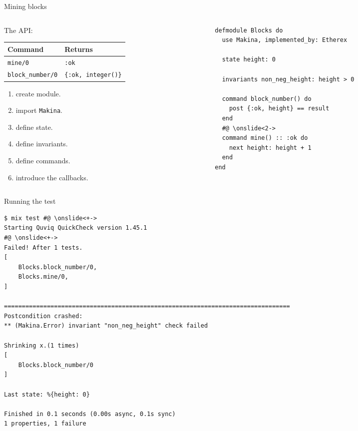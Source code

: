 \documentclass[aspectratio=169, 10pt]{beamer}
\begin{document}
\begin{frame}[label={sec:org8c4234a},fragile]{Mining blocks}
 \begin{columns}
\begin{column}{0.48\columnwidth}
The API:

\begin{center}
\begin{tabular}{ll}
Command & Returns\\
\hline
\texttt{mine/0} & \texttt{:ok}\\
\texttt{block\_number/0} & \texttt{\{:ok, integer()\}}\\
\end{tabular}
\end{center}

\vspace{10pt}
\begin{enumerate}
\item create module.
\item import \texttt{Makina}.
\item define state.
\item define invariants.
\item define commands.
\item introduce the callbacks.
\end{enumerate}
\end{column}

\begin{column}{0.48\columnwidth}
\lstset{language=elixir,label= ,caption= ,captionpos=b,numbers=none,style=display}
\begin{lstlisting}
defmodule Blocks do
  use Makina, implemented_by: Etherex

  state height: 0

  invariants non_neg_height: height > 0

  command block_number() do
    post {:ok, height} == result
  end
  #@ \onslide<2->
  command mine() :: :ok do
    next height: height + 1
  end
end
\end{lstlisting}
\end{column}
\end{columns}
\end{frame}

\begin{frame}[label={sec:org5ec2dda},fragile]{Running the test}
 \onslide<+->
\onslide<+->
\lstset{language=bash,label= ,caption= ,captionpos=b,numbers=none,style=shell}
\begin{lstlisting}
$ mix test #@ \onslide<+->
Starting Quviq QuickCheck version 1.45.1
#@ \onslide<+->
Failed! After 1 tests.
[
    Blocks.block_number/0,
    Blocks.mine/0,
]

================================================================================
Postcondition crashed:
** (Makina.Error) invariant "non_neg_height" check failed

Shrinking x.(1 times)
[
    Blocks.block_number/0
]

Last state: %{height: 0}

Finished in 0.1 seconds (0.00s async, 0.1s sync)
1 properties, 1 failure
\end{lstlisting}
\end{frame}
\end{document}

